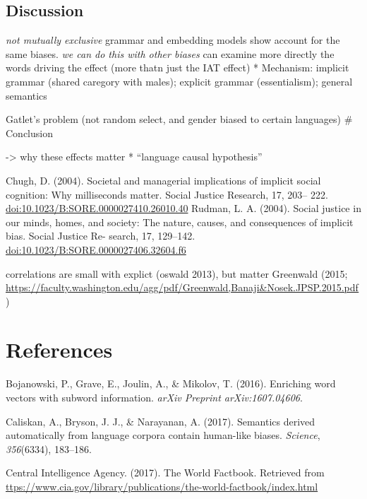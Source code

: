 \documentclass[10pt, letterpaper]{article}
\begin{document}
\subsection{Discussion}\label{discussion-2}

\emph{not mutually exclusive }grammar and embedding models show account
for the same biases. \emph{we can do this with other biases }can examine
more directly the words driving the effect (more thatn just the IAT
effect) * Mechanism: implicit grammar (shared caregory with males);
explicit grammar (essentialism); general semantics

Gatlet's problem (not random select, and gender biased to certain
languages) \# Conclusion

-\textgreater{} why these effects matter * ``language causal
hypothesis''

Chugh, D. (2004). Societal and managerial implications of implicit
social cognition: Why milliseconds matter. Social Justice Research, 17,
203-- 222. \url{doi:10.1023/B:SORE.0000027410.26010.40} Rudman, L. A.
(2004). Social justice in our minds, homes, and society: The nature,
causes, and consequences of implicit bias. Social Justice Re- search,
17, 129--142. \url{doi:10.1023/B:SORE.0000027406.32604.f6}

correlations are small with explict (oswald 2013), but matter Greenwald
(2015;
\url{https://faculty.washington.edu/agg/pdf/Greenwald,Banaji\&Nosek.JPSP.2015.pdf})

\section{References}\label{references}

\setlength{\parindent}{-0.1in} \setlength{\leftskip}{0.125in} \noindent

\hypertarget{refs}{}
\hypertarget{ref-bojanowski2016enriching}{}
Bojanowski, P., Grave, E., Joulin, A., \& Mikolov, T. (2016). Enriching
word vectors with subword information. \emph{arXiv Preprint
arXiv:1607.04606}.

\hypertarget{ref-caliskan2017semantics}{}
Caliskan, A., Bryson, J. J., \& Narayanan, A. (2017). Semantics derived
automatically from language corpora contain human-like biases.
\emph{Science}, \emph{356}(6334), 183--186.

\hypertarget{ref-ciafactbook}{}
Central Intelligence Agency. (2017). The World Factbook. Retrieved from
\url{ttps://www.cia.gov/library/publications/the-world-factbook/index.html}
\end{document}
